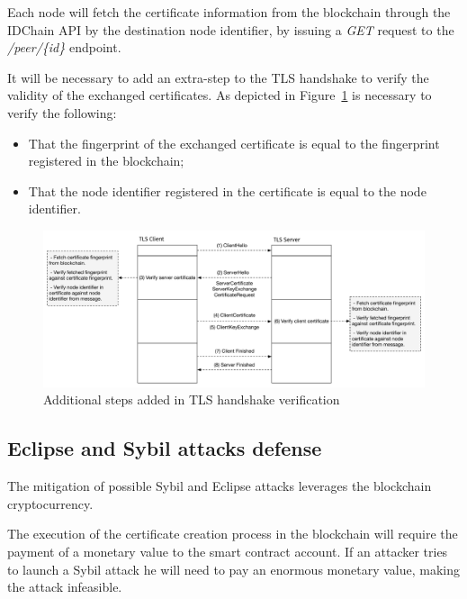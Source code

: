 {Each node will fetch the certificate information from the blockchain through the IDChain API by the destination node identifier, by issuing a \textit{GET} request to the \textit{/peer/\{id\}} endpoint.

It will be necessary to add an extra-step to the TLS handshake to verify the validity of the exchanged certificates.
As depicted in Figure~\ref{fig:tls-handshake-plus} is necessary to verify the following:

\begin{itemize}
  \item That the fingerprint of the exchanged certificate is equal to the fingerprint registered in the blockchain;
  \item That the node identifier registered in the certificate is equal to the node identifier.
\end{itemize}

\begin{figure}[htb]
  \includegraphics[width=\linewidth]{Figures/tls-handshake-plus.pdf}
  \caption{Additional steps added in TLS handshake verification}
\label{fig:tls-handshake-plus}
\end{figure}


\subsection{Eclipse and Sybil attacks defense}
The mitigation of possible Sybil and Eclipse attacks leverages the blockchain cryptocurrency.

The execution of the certificate creation process in the blockchain will require the payment of a monetary value to the smart contract account.
If an attacker tries to launch a Sybil attack he will need to pay an enormous monetary value, making the attack infeasible.

}

